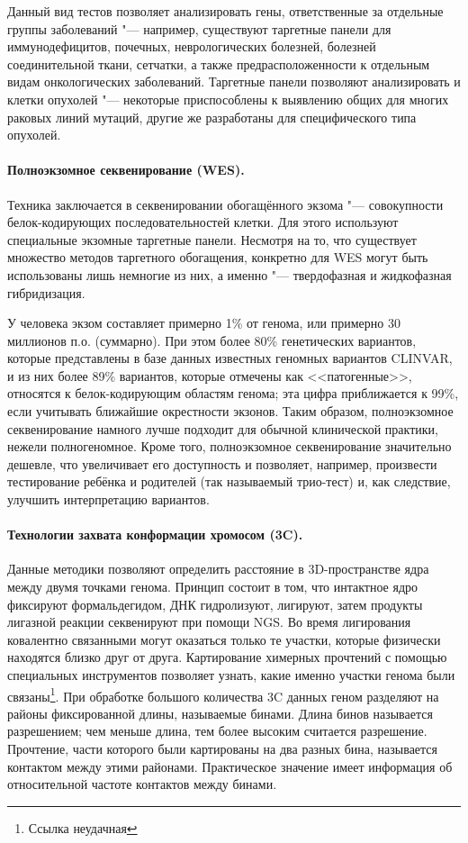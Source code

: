 \documentclass[a4paper,12pt]{article}
\begin{document}
Данный вид тестов позволяет анализировать гены, ответственные за отдельные группы заболеваний "--- например, существуют таргетные панели для иммунодефицитов, почечных, неврологических болезней, болезней соединительной ткани, сетчатки, а также предрасположенности к отдельным видам онкологических заболеваний.
Таргетные панели позволяют анализировать и клетки опухолей "--- некоторые приспособлены к выявлению общих для многих раковых линий мутаций, другие же разработаны для специфического типа опухолей\cite{Yohe_2017}.

\paragraph{Полноэкзомное секвенирование (WES).}
Техника заключается в секвенировании обогащённого экзома "--- совокупности белок-кодирующих последовательностей клетки.
Для этого используют специальные экзомные таргетные панели.
Несмотря на то, что существует множество методов таргетного обогащения, конкретно для WES могут быть использованы лишь немногие из них, а именно "--- твердофазная и жидкофазная гибридизация\cite{Teer_2010}.

У человека экзом составляет примерно 1\% от генома, или примерно 30 миллионов п.о. (суммарно).
При этом более 80\% генетических вариантов, которые представлены в базе данных известных геномных вариантов CLINVAR, и из них более 89\% вариантов, которые отмечены как <<патогенные>>, относятся к белок-кодирующим областям генома;
эта цифра приближается к 99\%, если учитывать ближайшие окрестности экзонов\cite{Barbitoff_2020}.
Таким образом, полноэкзомное секвенирование намного лучше подходит для обычной клинической практики, нежели полногеномное.
Кроме того, полноэкзомное секвенирование значительно дешевле, что увеличивает его доступность и позволяет, например, произвести тестирование ребёнка и родителей (так называемый трио-тест) и, как следствие, улучшить интерпретацию вариантов\cite{Yohe_2017}.

\paragraph{Технологии захвата конформации хромосом (3C).}
Данные методики позволяют определить расстояние в 3D-пространстве ядра между двумя точками генома.
Принцип состоит в том, что интактное ядро фиксируют формальдегидом, ДНК гидролизуют, лигируют, затем продукты лигазной реакции секвенируют при помощи NGS.
Во время лигирования ковалентно связанными могут оказаться только те участки, которые физически находятся близко друг от друга.
Картирование химерных прочтений с помощью специальных инструментов позволяет узнать, какие именно участки генома были связаны\cite{Dekker_2002}\footnote{Ссылка неудачная}.
При обработке большого количества 3C данных геном разделяют на районы фиксированной длины, называемые бинами.
Длина бинов называется разрешением; чем меньше длина, тем более высоким считается разрешение.
Прочтение, части которого были картированы на два разных бина, называется контактом между этими районами.
Практическое значение имеет информация об относительной частоте контактов между бинами.
\end{document}
